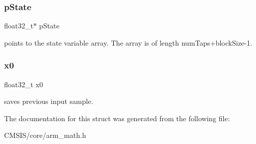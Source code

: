 \subsubsection{\texorpdfstring{p\+State}{pState}}
{\footnotesize\ttfamily float32\+\_\+t$\ast$ p\+State}

points to the state variable array. The array is of length num\+Taps+block\+Size-\/1. \mbox{\label{structarm__lms__norm__instance__f32_ab56b6f83c5b324c3ef620474b6e5a6e1}} 
\subsubsection{\texorpdfstring{x0}{x0}}
{\footnotesize\ttfamily float32\+\_\+t x0}

saves previous input sample. 

The documentation for this struct was generated from the following file\+:\begin{DoxyCompactItemize}
\item 
C\+M\+S\+I\+S/core/arm\+\_\+math.\+h\end{DoxyCompactItemize}

